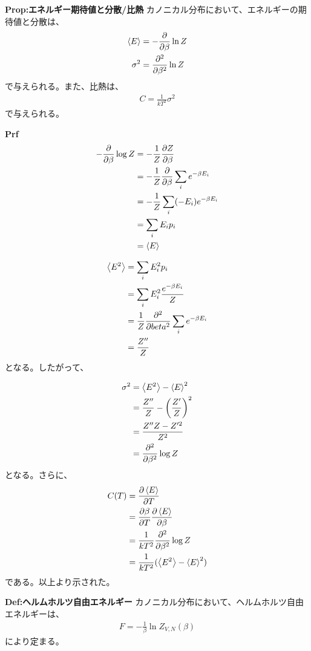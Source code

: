 \documentclass[a4paper,11pt]{jsarticle}
\numberwithin{equation}{section}
\begin{document}
\begin{itembox}[l]{\textbf{Prop:エネルギー期待値と分散/比熱}}
  カノニカル分布において、エネルギーの期待値と分散は、
  \begin{align}
    \expval{E} &= -\pdv{\beta}\ln Z\\
    \sigma^2 &= \pdv[2]{\beta}\ln Z
  \end{align}
  で与えられる。また、比熱は、
  \begin{align}
    C = \frac{1}{kT^2}\sigma^2
  \end{align}
  で与えられる。

\end{itembox}
\textbf{Prf}\\
\begin{align}
  -\pdv{\beta}\log Z &= -\frac{1}{Z}\pdv{Z}{\beta}\\
  &= -\frac{1}{Z}\pdv{}{\beta}\sum_{i}e^{-\beta E_{i}}\\
  &= -\frac{1}{Z}\sum_{i}(-E_{i})e^{-\beta E_{i}}\\
  &= \sum_{i}E_{i}p_{i}\\
  &= \expval{E}
\end{align}

\begin{align}
  \ev{E^2} &= \sum_{i}E_{i}^2p_{i}\\
  &=\sum_{i}E_{i}^2\frac{e^{-\beta E_{i}}}{Z}\\
  &=\frac{1}{Z}\pdv[2]{beta}\sum_{i}e^{-\beta E_{i}}\\
  &=\frac{Z''}{Z}
\end{align}
となる。したがって、

\begin{align}
  \sigma^2 &= \ev{E^2} - \ev{E}^2\\
  &= \frac{Z''}{Z} - \left( \frac{Z'}{Z} \right)^2\\
  &= \frac{Z''Z - Z'^2}{Z^2}\\
  &=\pdv[2]{\beta}\log Z
\end{align}
となる。さらに、
\begin{align}
  C(T)&=\pdv{\ev{E}}{T}\\
  &=\pdv{\beta}{T}\pdv{\ev{E}}{\beta}\\
  &=\frac{1}{kT^2}\pdv[2]{\beta}\log Z\\
  &=\frac{1}{kT^2}(\ev{E^2}-\ev{E}^2)
\end{align}
である。以上より示された。\hfill\qedsymbol\\

\begin{itembox}[l]{\textbf{Def:ヘルムホルツ自由エネルギー}}
  カノニカル分布において、ヘルムホルツ自由エネルギーは、
  \begin{align}
    F = -\frac{1}{\beta}\ln Z_{V,N}(\beta) \label{eq:helmholtz}
  \end{align}
  により定まる。
\end{itembox}
\end{document}
